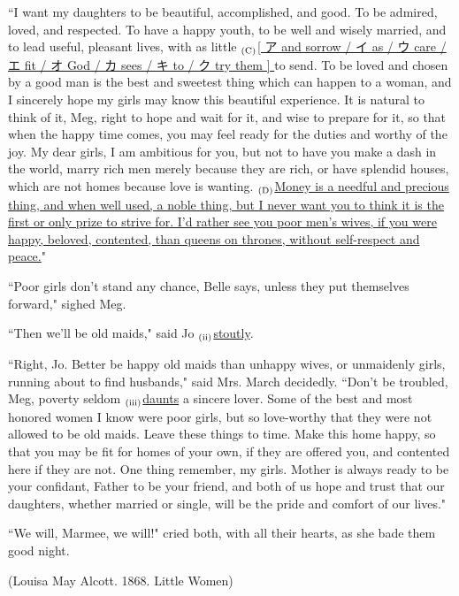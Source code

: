 \documentclass[12pt,a4paper,dvipdfmx]{jarticle}
\begin{document}
\begin{spacing}{1.5}
``I want my daughters to be beautiful, accomplished, and good. To be admired, loved, and respected. To have a happy youth, to be well and wisely married, and to lead useful, pleasant lives, with as little $_{\rm(C)}$\ul{[ ア and sorrow / イ as / ウ care / エ fit / オ God / カ sees / キ to / ク try them ] }to send. To be loved and chosen by a good man is the best and sweetest thing which can happen to a woman, and I sincerely hope my girls may know this beautiful experience. It is natural to think of it, Meg, right to hope and wait for it, and wise to prepare for it, so that when the happy time comes, you may feel ready for the duties and worthy of the joy. My dear girls, I am ambitious for you, but not to have you make a dash in the world, marry rich men merely because they are rich, or have splendid houses, which are not homes because love is wanting. $_{\rm(D)}$\ul{Money is a needful and precious thing, and when well used, a noble thing, but I never want you to think it is the first or only prize to strive for. I'd rather see you poor men's wives, if you were happy, beloved, contented, than queens on thrones, without self-respect and peace.}"

``Poor girls don't stand any chance, Belle says, unless they put themselves forward," sighed Meg.

``Then we'll be old maids," said Jo $_{\rm(ii)}$\ul{stoutly}.

``Right, Jo. Better be happy old maids than unhappy wives, or unmaidenly girls, running about to find husbands," said Mrs. March decidedly. ``Don't be troubled, Meg, poverty seldom $_{\rm(iii)}$\ul{daunts} a sincere lover. Some of the best and most honored women I know were poor girls, but so love-worthy that they were not allowed to be old maids. Leave these things to time. Make this home happy, so that you may be fit for homes of your own, if they are offered you, and contented here if they are not. One thing remember, my girls. Mother is always ready to be your confidant, Father to be your friend, and both of us hope and trust that our daughters, whether married or single, will be the pride and comfort of our lives."

``We will, Marmee, we will!" cried both, with all their hearts, as she bade them good night.

\vspace{-5mm}\begin{center}
(Louisa May Alcott. 1868. Little Women)
\end{center}\vspace{-5mm}


\end{spacing}
\end{document}
